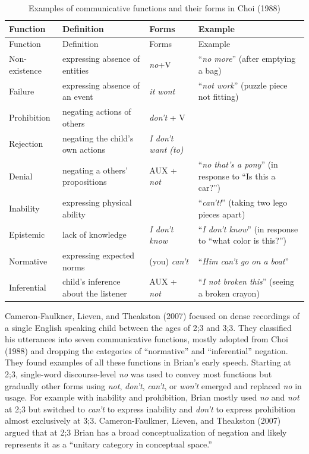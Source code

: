 \documentclass[
  english,
  man,floatsintext]{apa6}
\begin{document}
\begin{longtable}[]{@{}
  >{\raggedright\arraybackslash}p{}
  >{\raggedright\arraybackslash}p{}
  >{\raggedright\arraybackslash}p{}
  >{\raggedright\arraybackslash}p{}@{}}
\caption{\label{tab:choi} Examples of communicative functions and their forms in Choi (1988)}\tabularnewline
\toprule
Function & Definition & Forms & Example \\
\midrule
\endfirsthead
\toprule
Function & Definition & Forms & Example \\
\midrule
\endhead
Non-existence & expressing absence of entities & \emph{no}+V & ``\emph{no more}'' (after emptying a bag) \\
Failure & expressing absence of an event & \emph{it wont} & ``\emph{not work}'' (puzzle piece not fitting) \\
Prohibition & negating actions of others & \emph{don't} + V & \\
Rejection & negating the child's own actions & \emph{I don't want (to)} & \\
Denial & negating a others' propositions & AUX + \emph{not} & ``\emph{no that's a pony}'' (in response to ``Is this a car?'') \\
Inability & expressing physical ability & & ``\emph{can't!}'' (taking two lego pieces apart) \\
Epistemic & lack of knowledge & \emph{I don't know} & ``\emph{I don't know}'' (in response to ``what color is this?'') \\
Normative & expressing expected norms & (you) \emph{can't} & ``\emph{Him can't go on a boat}'' \\
Inferential & child's inference about the listener & AUX + \emph{not} & ``\emph{I not broken this}'' (seeing a broken crayon) \\
\bottomrule
\end{longtable}

Cameron-Faulkner, Lieven, and Theakston (2007) focused on dense recordings of a single English speaking child between the ages of 2;3 and 3;3. They classified his utterances into seven communicative functions, mostly adopted from Choi (1988) and dropping the categories of ``normative'' and ``inferential'' negation. They found examples of all these functions in Brian's early speech. Starting at 2;3, single-word discourse-level \emph{no} was used to convey most functions but gradually other forms using \emph{not}, \emph{don't}, \emph{can't}, or \emph{won't} emerged and replaced \emph{no} in usage. For example with inability and prohibition, Brian mostly used \emph{no} and \emph{not} at 2;3 but switched to \emph{can't} to express inability and \emph{don't} to express prohibition almost exclusively at 3;3. Cameron-Faulkner, Lieven, and Theakston (2007) argued that at 2;3 Brian has a broad conceptualization of negation and likely represents it as a ``unitary category in conceptual space.''
\end{document}
